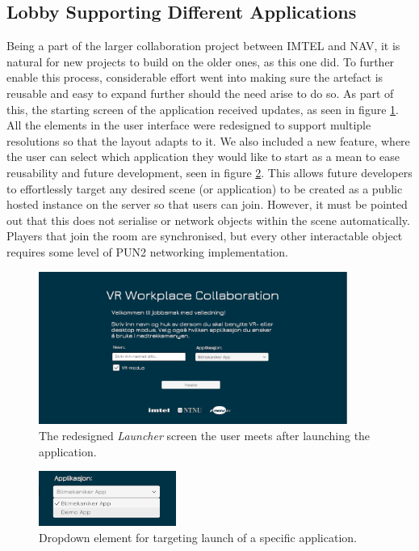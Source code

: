 \subsection{Lobby Supporting Different Applications}
\label{section:lobbySystem}
Being a part of the larger collaboration project between IMTEL and NAV, it is natural for new projects to build on the older ones, as this one did. To further enable this process, considerable effort went into making sure the artefact is reusable and easy to expand further should the need arise to do so. As part of this, the starting screen of the application received updates, as seen in figure \ref{fig:phase3_lobby1}. All the elements in the user interface were redesigned to support multiple resolutions so that the layout adapts to it.  
We also included a new feature, where the user can select which application they would like to start as a mean to ease reusability and future development, seen in figure \ref{fig:phase3_dropwdown}. This allows future developers to effortlessly target any desired scene (or application) to be created as a public hosted instance on the server so that users can join. 
However, it must be pointed out that this does not serialise or network objects within the scene automatically. Players that join the room are synchronised, but every other interactable object requires some level of PUN2 networking implementation. 
    

\begin{figure}[H]
  \centering
   \captionsetup{width=.9\linewidth}
    \includegraphics[width=0.9\textwidth]{fig/phase_3/implementation/Lobby1.PNG}
 \caption{The redesigned \textit{Launcher} screen the user meets after launching the application.}
\label{fig:phase3_lobby1}
\end{figure}



\begin{figure}[H]
  \centering
   \captionsetup{width=.4\linewidth}
    \includegraphics[width=0.4\textwidth]{fig/phase_3/implementation/LauncherDropdown1.png}
 \caption{Dropdown element for targeting launch of a specific application. }
\label{fig:phase3_dropwdown}
\end{figure}

